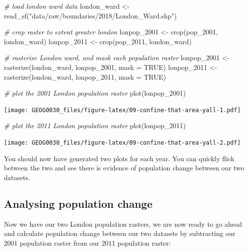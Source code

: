 \documentclass[
]{book}
\newenvironment{Shaded}{\begin{snugshade}}{\end{snugshade}}
\newcommand{\AttributeTok}[1]{\textcolor[rgb]{0.77,0.63,0.00}{#1}}
\newcommand{\CommentTok}[1]{\textcolor[rgb]{0.56,0.35,0.01}{\textit{#1}}}
\newcommand{\ConstantTok}[1]{\textcolor[rgb]{0.00,0.00,0.00}{#1}}
\newcommand{\FunctionTok}[1]{\textcolor[rgb]{0.00,0.00,0.00}{#1}}
\newcommand{\NormalTok}[1]{#1}
\newcommand{\OtherTok}[1]{\textcolor[rgb]{0.56,0.35,0.01}{#1}}
\newcommand{\StringTok}[1]{\textcolor[rgb]{0.31,0.60,0.02}{#1}}
\begin{document}
\begin{Shaded}
\begin{Highlighting}[]
\CommentTok{\# load london ward data}
\NormalTok{london\_ward }\OtherTok{\textless{}{-}} \FunctionTok{read\_sf}\NormalTok{(}\StringTok{"data/raw/boundaries/2018/London\_Ward.shp"}\NormalTok{)}

\CommentTok{\# crop raster to extent greater london}
\NormalTok{lonpop\_2001 }\OtherTok{\textless{}{-}} \FunctionTok{crop}\NormalTok{(pop\_2001, london\_ward)}
\NormalTok{lonpop\_2011 }\OtherTok{\textless{}{-}} \FunctionTok{crop}\NormalTok{(pop\_2011, london\_ward)}

\CommentTok{\# rasterise London ward, and mask each population raster}
\NormalTok{lonpop\_2001 }\OtherTok{\textless{}{-}} \FunctionTok{rasterize}\NormalTok{(london\_ward, lonpop\_2001, }\AttributeTok{mask =} \ConstantTok{TRUE}\NormalTok{)}
\NormalTok{lonpop\_2011 }\OtherTok{\textless{}{-}} \FunctionTok{rasterize}\NormalTok{(london\_ward, lonpop\_2011, }\AttributeTok{mask =} \ConstantTok{TRUE}\NormalTok{)}

\CommentTok{\# plot the 2001 London population raster}
\FunctionTok{plot}\NormalTok{(lonpop\_2001)}
\end{Highlighting}
\end{Shaded}

\texttt{[image: GEOG0030\_files/figure-latex/09-confine-that-area-yall-1.pdf]}

\begin{Shaded}
\begin{Highlighting}[]
\CommentTok{\# plot the 2011 London population raster}
\FunctionTok{plot}\NormalTok{(lonpop\_2011)}
\end{Highlighting}
\end{Shaded}

\texttt{[image: GEOG0030\_files/figure-latex/09-confine-that-area-yall-2.pdf]}

You should now have generated two plots for each year. You can quickly flick between the two and see there is evidence of population change between our two datasets.

\hypertarget{analysing-population-change}{%
\subsection{Analysing population change}\label{analysing-population-change}}

Now we have our two London population rasters, we are now ready to go ahead and calculate population change between our two datasets by subtracting our 2001 population raster from our 2011 population raster:
\end{document}
